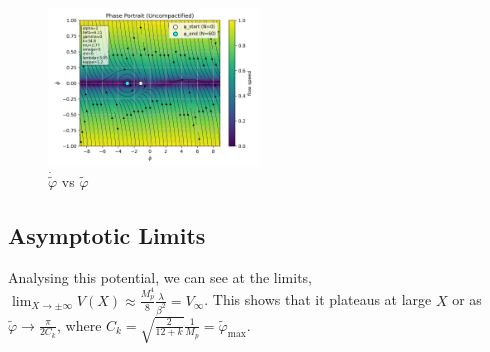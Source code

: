 \documentclass[aps,prd,reprint,preprintnumbers,showpacs,floatfix,nofootinbib,superscript address]{revtex4-2}
\begin{document}
\begin{figure}[h!]
    \centering
    \includegraphics[width=0.5\textwidth]{../../Python/Figures/AE/inflation_plots/phase_portrait.png}
    \caption{$\dot{\tilde{\varphi}}$ vs $\tilde{\varphi}$}
    \label{Phase Space potrait1}
\end{figure}

\subsection{Asymptotic Limits} \label{Aymptotic limits}
Analysing this potential, we can see at the limits, $\lim_{X \rightarrow \pm \infty} V(X) \approx \frac{M_p^4}{8} \frac{\lambda}{\beta^2} = V_\infty$. This shows that it plateaus at large $X$ or as $\tilde{\varphi} \rightarrow \frac{\pi}{2 C_k}$, where $C_k = \sqrt{\frac{2}{12+k}} \frac{1}{M_p} = \tilde{\varphi}_\text{max}$.
\end{document}
